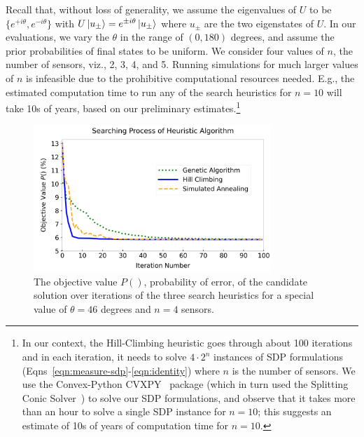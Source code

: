 Recall that, without loss of generality, we assume the eigenvalues of 
$U$ to be $\{e^{+i\theta}, e^{-i\theta}\}$ with $U\ket{u_{\pm}}=e^{\pm i\theta}\ket{u_{\pm}}$ where $u_{\pm}$ are the
two eigenstates of $U$.
In our evaluations, we vary the $\theta$ in the range of $(0, 180)$ degrees, and
assume the prior probabilities of final states to be uniform. We consider four values of $n$, the number of sensors, viz., 2, 3, 4, and 5. Running simulations for much larger values of $n$ is infeasible due to the prohibitive computational resources needed. 
E.g., the estimated computation time to run any of the search 
heuristics for $n=10$ will take 10s of years, based on our 
preliminary 
estimates.\footnote{In our context, the Hill-Climbing heuristic goes through about 100
iterations and in each iteration, it needs to solve $4\cdot2^n$ instances of SDP formulations 
(Eqns~\ref{eqn:measure-sdp}-\ref{eqn:identity}) where $n$ is the number of sensors. 
We use the Convex-Python CVXPY~\cite{diamond2016cvxpy} package
(which in turn used the Splitting Conic Solver~\cite{sdp-solver}) to solve our SDP formulations, and observe that it takes more than an hour to 
solve a single SDP instance for $n=10$; this suggests an estimate of 10s of years of computation time for $n=10$.}


\begin{figure}
    \centering
    \includegraphics[width=0.8\textwidth]{chapters/tqc/figures/compare_methods_similar.png}
    \caption{The objective value $P()$, probability of error, of the candidate solution over iterations of the 
    three search heuristics for a special value of $\theta =46$ degrees and $n = 4$ sensors.}
    \label{fig:iterations}
\end{figure}



